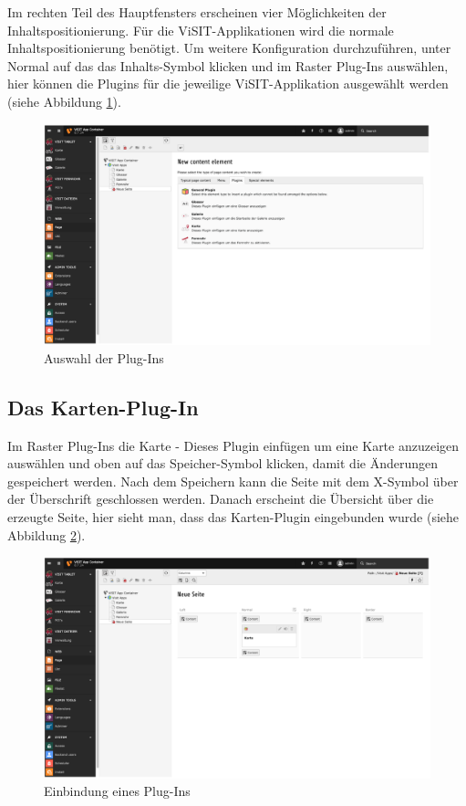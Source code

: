 Im rechten Teil des Hauptfensters erscheinen vier Möglichkeiten der Inhaltspositionierung. Für die ViSIT-Applikationen wird die normale Inhaltspositionierung benötigt.  Um weitere Konfiguration durchzuführen, unter \glqq Normal\grqq{} auf das das Inhalts-Symbol klicken und im Raster \glqq Plug-Ins\grqq{} auswählen, hier können die Plugins für die jeweilige ViSIT-Applikation ausgewählt werden (siehe Abbildung \ref{img:auswahl_plugins}).

\begin{figure}[ht!]
\centering
\includegraphics[width=12cm]{Figures/paula/typo3/auswahl_plugins.png}
\caption{Auswahl der Plug-Ins}
\label{img:auswahl_plugins}
\end{figure}

\subsection{Das Karten-Plug-In}

Im Raster \glqq Plug-Ins\grqq{} die \glqq Karte - Dieses Plugin einfügen um eine Karte anzuzeigen\grqq{} auswählen und oben auf das Speicher-Symbol klicken, damit die Änderungen gespeichert werden. Nach dem Speichern kann die Seite mit dem X-Symbol über der Überschrift geschlossen werden. Danach erscheint die Übersicht über die erzeugte Seite, hier sieht man, dass das Karten-Plugin eingebunden wurde (siehe Abbildung \ref{img:einbindung_plugins}).

\begin{figure}[ht!]
\centering
\includegraphics[width=12cm]{Figures/paula/typo3/einbindung_plugin.png}
\caption{Einbindung eines Plug-Ins}
\label{img:einbindung_plugins}
\end{figure}

